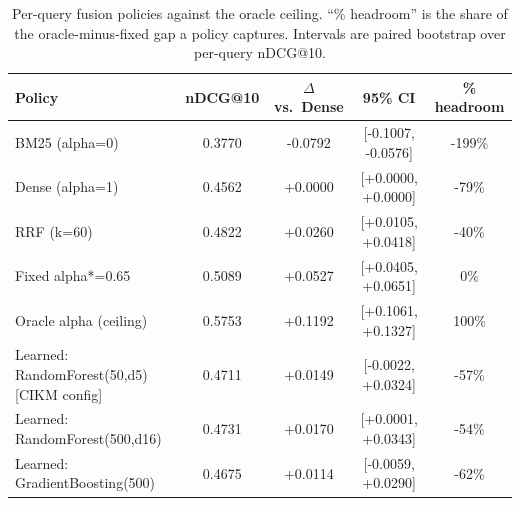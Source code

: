\begin{table}[t]
\centering
\small
\caption{Per-query fusion policies against the oracle ceiling. ``\% headroom'' is the share of the oracle-minus-fixed gap a policy captures. Intervals are paired bootstrap over per-query nDCG@10.}
\label{tab:alpha_policies}
\begin{tabular}{lcccc}
\toprule
Policy & nDCG@10 & $\Delta$ vs.\ Dense & 95\% CI & \% headroom \\
\midrule
BM25 (alpha=0) & 0.3770 & -0.0792 & [-0.1007, -0.0576] & -199\% \\
Dense (alpha=1) & 0.4562 & +0.0000 & [+0.0000, +0.0000] & -79\% \\
RRF (k=60) & 0.4822 & +0.0260 & [+0.0105, +0.0418] & -40\% \\
Fixed alpha*=0.65 & 0.5089 & +0.0527 & [+0.0405, +0.0651] & 0\% \\
Oracle alpha (ceiling) & 0.5753 & +0.1192 & [+0.1061, +0.1327] & 100\% \\
Learned: RandomForest(50,d5) [CIKM config] & 0.4711 & +0.0149 & [-0.0022, +0.0324] & -57\% \\
Learned: RandomForest(500,d16) & 0.4731 & +0.0170 & [+0.0001, +0.0343] & -54\% \\
Learned: GradientBoosting(500) & 0.4675 & +0.0114 & [-0.0059, +0.0290] & -62\% \\
\bottomrule
\end{tabular}
\end{table}
